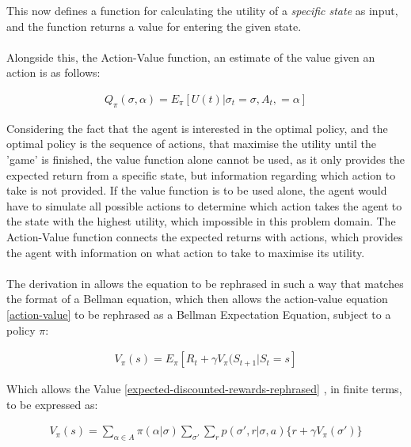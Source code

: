 \documentclass[ %
                    author={Ashwinder Khurana},
                supervisor={Prof Dave Cliff},
                    degree={MEng},
                     title={The Deeply Reinforced Trader},
                  subtitle={},
                      type={enterprise},
                      year={2020} ]{dissertation}
\begin{document}
{\noindent 
This now defines a function for calculating the utility of a \textit{specific state} as input, and the function returns a value for entering the given state.
\\
\\
Alongside this, the Action-Value function, an estimate of the value given an action is as follows:


\begin{equation}
\label{action-value}
\begin{split}
Q_\pi(\sigma , \alpha) = E_\pi [U(t) | \sigma_t = \sigma, A_t, = \alpha]
\end{split}
\end{equation}


\noindent 
Considering the fact that the agent is interested in the optimal policy, and the optimal policy is the sequence of actions, that maximise the utility until the 'game' is finished, the value function alone cannot be used, as it only provides the expected return from a specific state, but information regarding which action to take is not provided. If the value function is to be used alone, the agent would have to simulate all possible actions to determine which action takes the agent to the state with the highest utility, which impossible in this problem domain. The Action-Value function connects the expected returns with actions, which provides the agent with information on what action to take to maximise its utility. 
\\
\\
The derivation in \cite{rearrange-value-function https://www.jeremyjordan.me/markov-decision-process} allows the equation to be rephrased in such a way that matches the format of a Bellman equation, which then allows the action-value equation \ref{action-value} to be rephrased as a Bellman Expectation Equation, subject to a policy $\pi$:

\begin{equation}
\label{bellman}
\begin{split}
V_\pi(s) = E_\pi[R_t + \gamma V_\pi(S_{t+1} | S_t = s]
\end{split}
\end{equation}

\noindent
Which allows the Value \ref{expected-discounted-rewards-rephrased} , in finite terms, to be expressed as:

\begin{equation}
\label{bellman}
\begin{split}
V_\pi(s) = \sum\limits^{}_{\alpha \in A}{\pi(\alpha | \sigma)} \sum\limits^{}_{\sigma'}{\sum\limits^{}_{r}{p(\sigma' , r | \sigma, a) \{r + \gamma V_\pi(\sigma')\}}}
\end{split}
\end{equation}

}
\end{document}
